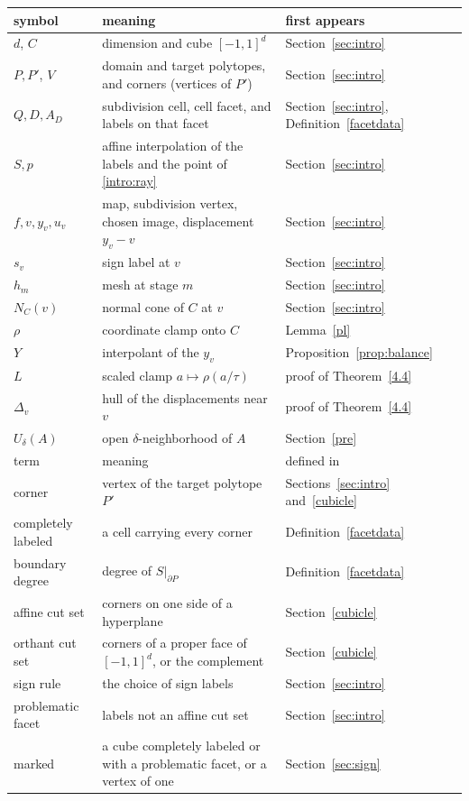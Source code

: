 \documentclass[11pt]{amsart}
\theoremstyle{definition}
\theoremstyle{remark}
\numberwithin{equation}{section}
\begin{document}
\begin{center}
\begin{tabular}{@{}lp{}l@{}}
\toprule
symbol & meaning & first appears\\
\midrule
$d$, $C$ & dimension and cube $[-1,1]^d$ & Section~\ref{sec:intro}\\
$P,P'$, $V$ & domain and target polytopes, and corners (vertices of $P'$) & Section~\ref{sec:intro}\\
$Q,D,A_D$ & subdivision cell, cell facet, and labels on that facet & Section~\ref{sec:intro}, Definition~\ref{facetdata}\\
$S,p$ & affine interpolation of the labels and the point of \eqref{intro:ray} & Section~\ref{sec:intro}\\
$f,v,y_v,u_v$ & map, subdivision vertex, chosen image, displacement $y_v-v$ & Section~\ref{sec:intro}\\
$s_v$ & sign label at $v$ & Section~\ref{sec:intro}\\
$h_m$ & mesh at stage $m$ & Section~\ref{sec:intro}\\
$N_C(v)$ & normal cone of $C$ at $v$ & Section~\ref{sec:intro}\\
$\rho$ & coordinate clamp onto $C$ & Lemma~\ref{pl}\\
$Y$ & interpolant of the $y_v$ & Proposition~\ref{prop:balance}\\
$L$ & scaled clamp $a\mapsto\rho(a/\tau)$ & proof of Theorem~\ref{4.4}\\
$\Delta_v$ & hull of the displacements near $v$ & proof of Theorem~\ref{4.4}\\
$U_\delta(A)$ & open $\delta$-neighborhood of $A$ & Section~\ref{pre}\\
\midrule
term & meaning & defined in\\
\midrule
corner & vertex of the target polytope $P'$ & Sections~\ref{sec:intro} and~\ref{cubicle}\\
completely labeled & a cell carrying every corner & Definition~\ref{facetdata}\\
boundary degree & degree of $S|_{\partial P}$ & Definition~\ref{facetdata}\\
affine cut set & corners on one side of a hyperplane & Section~\ref{cubicle}\\
orthant cut set & corners of a proper face of $[-1,1]^d$, or the complement & Section~\ref{cubicle}\\
sign rule & the choice of sign labels & Section~\ref{sec:intro}\\
problematic facet & labels not an affine cut set & Section~\ref{sec:intro}\\
marked & a cube completely labeled or with a problematic facet, or a vertex of one & Section~\ref{sec:sign}\\
\bottomrule
\end{tabular}
\end{center}
\end{document}
